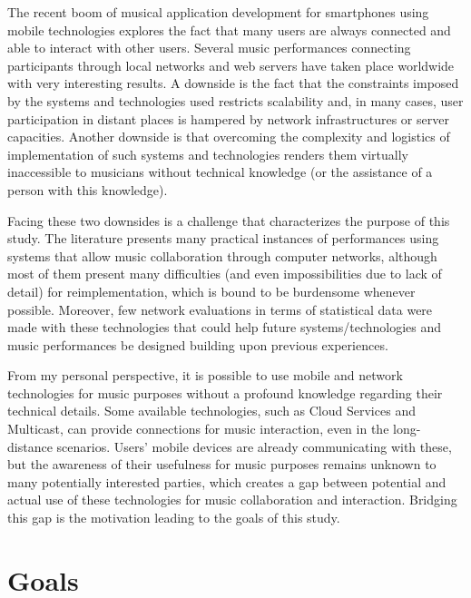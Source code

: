 The recent boom of musical application development for smartphones using mobile technologies explores the fact that many users are always connected and able to interact with other users. 
Several music performances connecting participants through local networks and web servers have taken place worldwide with very interesting results. 
A downside is the fact that the constraints imposed by the systems and technologies used restricts scalability and, in many cases, user participation in distant places is hampered by network infrastructures or server capacities. 
Another downside is that overcoming the complexity and logistics of implementation of such systems and technologies renders them virtually inaccessible to musicians without technical knowledge (or the assistance of a person with this knowledge).

Facing these two downsides is a challenge that characterizes the purpose of this study.
The literature presents many practical instances of performances using systems that allow music collaboration through computer networks, although most of them present many difficulties (and even impossibilities due to lack of detail) for reimplementation, which is bound to be burdensome whenever possible.
Moreover, few network evaluations in terms of statistical data were made with these technologies that could help future systems/technologies and music performances be designed building upon previous experiences.

From my personal perspective, it is possible to use mobile and network technologies for music purposes without a profound knowledge regarding their technical details. 
Some available technologies, such as Cloud Services and Multicast, can provide connections for music interaction, even in the long-distance scenarios. 
Users' mobile devices are already communicating with these, but the awareness of their usefulness for music purposes remains unknown to many potentially interested parties, which creates a gap between potential and actual use of these technologies for music collaboration and interaction. 
Bridging this gap is the motivation leading to the goals of this study.

\section{Goals}

